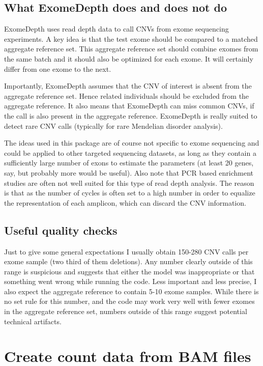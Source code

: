 \documentclass[10pt]{article}\usepackage[]{graphicx}\usepackage[]{color}
\begin{document}
\subsection{What ExomeDepth does and does not do}

ExomeDepth uses read depth data to call CNVs from exome sequencing experiments.
A key idea is that the test exome should be compared to a matched aggregate reference set.
This aggregate reference set should combine exomes from the same batch and it should also be optimized for each exome.
It will certainly differ from one exome to the next.

Importantly, ExomeDepth assumes that the CNV of interest is absent from the aggregate reference set.
Hence related individuals should be excluded from the aggregate reference.
It also means that ExomeDepth can miss common CNVs, if the call is also present in the aggregate reference.
ExomeDepth is really suited to detect rare CNV calls (typically for rare Mendelian disorder analysis).

The ideas used in this package are of course not specific to exome sequencing and could be applied to other targeted sequencing datasets, as long as they contain a sufficiently large number of exons to estimate the parameters (at least 20 genes, say, but probably more would be useful).
Also note that PCR based enrichment studies are often not well suited for this type of read depth analysis.
The reason is that as the number of cycles is often set to a high number in order to equalize the representation of each amplicon, which can discard the CNV information.


\subsection{Useful quality checks}
Just to give some general expectations I usually obtain 150-280 CNV calls per exome sample (two third of them deletions).
Any number clearly outside of this range is suspicious and suggests that either the model was inappropriate or that something went wrong while running the code.
Less important and less precise, I also expect the aggregate reference to contain 5-10 exome samples. 
While there is no set rule for this number, and the code may work very well with fewer exomes in the aggregate reference set, numbers outside of this range suggest potential technical artifacts.


\section{Create count data from BAM files}
\end{document}
